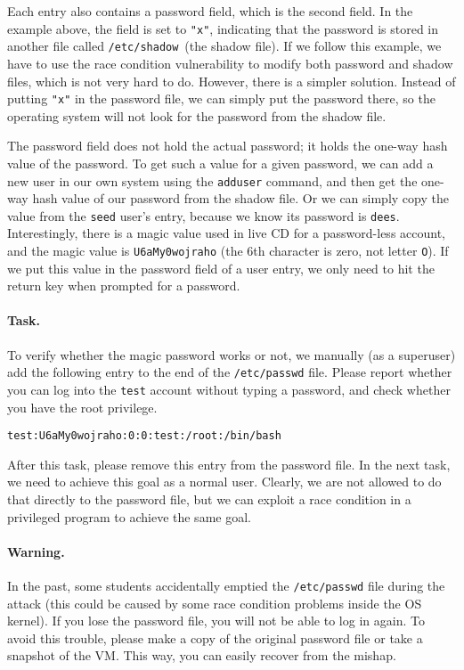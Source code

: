 Each entry also contains a password field, which is the second field. In the example above, the
field is set to \texttt{"x"}, indicating that the password is stored in another file called
\texttt{/etc/shadow}~(the shadow file). If we follow this example, we have to use the race condition
vulnerability to modify both password and shadow files, which is not
very hard to do. However, there is a simpler solution. Instead of putting \texttt{"x"} in the
password file, we can simply put the password there, so the operating system will not look for
the password from the shadow file.

The password field does not hold the actual password; it holds the one-way hash value of the
password. To get such a value for a given password, we can add a new user in our own system using
the \texttt{adduser} command, and then get the one-way hash value of our password from
the shadow file.  Or we can simply copy the value from the \texttt{seed} user's entry,
because we know its password is \texttt{dees}. Interestingly, there is a magic value
used in \ubuntu live CD for a password-less account, and the magic value is
\texttt{U6aMy0wojraho} (the 6th character is zero, not letter \texttt{O}). If we put this value
in the password field of a user entry, we only need to hit the return key when prompted for
a password.


\paragraph{Task.} To verify whether the magic password works or not, we
manually (as a superuser) add the following entry to the end of the \texttt{/etc/passwd} file. 
Please report whether you can log into the \texttt{test} account without
typing a password, and check whether you have the root privilege.

\begin{lstlisting}
test:U6aMy0wojraho:0:0:test:/root:/bin/bash
\end{lstlisting}

After this task, please remove this entry from the password file. In the
next task, we need to achieve this goal as a normal user. Clearly, we are
not allowed to do that directly to the password file, but we can exploit a
race condition in a privileged program to achieve the same goal.


\paragraph{Warning.}
In the past, some students accidentally emptied the {\tt /etc/passwd} file 
during the attack (this could be caused by some race condition problems
inside the OS kernel). If you lose
the password file, you will not be able to log in again. To avoid this 
trouble, please make a copy of the original password file or take a
snapshot of the VM. This way, you can easily recover from the mishap. 



